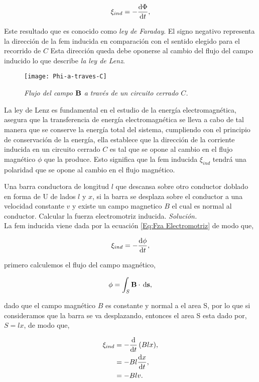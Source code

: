 \begin{equation}
	\label{Eq:LeyFaraday}
	\xi_{ind} = -\diff{\Phi}{t},
\end{equation}

Este resultado que es conocido como \emph{ley de Faraday}. El signo negativo representa la dirección de la fem inducida en comparación con el sentido elegido para el recorrido de $C$ Esta dirección queda debe oponerse al cambio del flujo del campo inducido lo que describe \emph{la ley de Lenz}.\\

\begin{figure}[H]
	\centering
	\texttt{[image: Phi-a-traves-C]}
	\caption{\emph{Flujo del campo $\textbf{B}$ a través de un circuito cerrado $C$.}}\label{Phi-a-traves-C}
\end{figure}

La ley de Lenz es fundamental en el estudio de la energía electromagnética, asegura que la transferencia de energía electromagnética se lleva a cabo de tal manera que se conserve la energía total del sistema, cumpliendo con el principio de conservación de la energía, ella establece que la dirección de la corriente inducida en un circuito cerrado $C$ es tal que se opone al cambio en el flujo magnético $\phi$ que la produce. Esto significa que la fem inducida $\xi_{ind}$ tendrá una polaridad que se opone al cambio en el flujo magnético.

	\begin{example}
		Una barra conductora de longitud $l$ que descansa sobre otro conductor doblado en forma de U de lados $l$ y $x$, si la barra se desplaza sobre el conductor a una velocidad constante $v$ y existe un campo magnetico $B$ el cual es normal al conductor. Calcular la fuerza electromotriz inducida.
		\emph{\textit{ Solución.}}\\

		La fem inducida viene dada por la ecuación \eqref{Eq:Fza Electromotriz} de modo que,

		\begin{equation*}
			\xi_{ind} = -\diff{\phi}{t},
		\end{equation*}

		primero calculemos el flujo del campo magnético,

		\begin{equation*}
			\phi = \int_{S} \B \cdot \dl{\textbf{s}},
		\end{equation*}

		dado que el campo magnético $B$ es constante y normal a el area S, por lo que si consideramos que la barra se va desplazando, entonces el area S esta dado por, $S = lx$, de modo que,

		\begin{align*}
			\xi_{ind} &= -\diff*{\left( Blx \right) }{t},\\
								&= -Bl \diff{x}{t},\\
								&= -Blv.
		\end{align*}
	\end{example}

